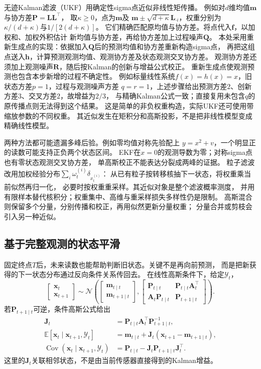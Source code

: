 无迹Kalman滤波（UKF）用确定性sigma点近似非线性矩传播。
例如对$d$维均值$\bm m$与协方差$\bm P=\bm L\bm L^\top$，
取$\kappa\geq0$，点为$\bm m$及
$\bm m\pm\sqrt{d+\kappa}\bm L_{\cdot i}$，权重分别为
$\kappa/(d+\kappa)$与$1/[2(d+\kappa)]$。
它们精确匹配原均值与协方差。将点代入$\bm f$，以加权和、加权外积估计
新均值与协方差，再给协方差加上过程噪声$\bm Q$。
本处采用重新生成点的实现：依据加入$\bm Q$后的预测均值和协方差重新构造sigma点，
再把这组点送入$\bm h$，计算预测观测均值、观测协方差及状态观测交叉协方差。
观测协方差还须加上观测噪声$\bm R$，随后按Kalman的创新与增益公式校正。
重新生成点使观测预测也包含本步新增的过程不确定性。
例如标量线性系统$f(x)=h(x)=x$，旧状态方差$p=1$，过程与观测噪声方差
$q=r=1$，上述步骤给出预测方差$2$、创新方差$3$、交叉方差$2$，故增益为$2/3$，
与精确Kalman公式一致；直接复用未包含$q$的原传播点则无法得到这个结果。
这是简单的非负权重构造，实际UKF还可使用带缩放参数的不同权重。
其近似发生在矩积分和高斯投影，不是把非线性模型变成精确线性模型。

两种方法都可能遗漏多峰后验。例如零均值对称先验配上
$y=x^2+v$，一个明显正的读数可能支持正负两个状态区间。
EKF在$x=0$的观测导数为零；对称sigma点也有零状态观测交叉协方差，
单高斯校正不能表达分裂成两峰的证据。
粒子滤波改用加权经验分布$\sum_i\omega_t^{(i)}\delta_{x_t^{(i)}}$：
从已有粒子按转移核抽下一状态，将权重乘当前似然再归一化，
必要时按权重重采样。其近似对象是整个滤波概率测度，
并用有限样本替代核积分；权重集中、高维与重采样损失多样性仍是限制。
高斯混合则保留多个分量，分别传播和校正，再用似然更新分量权重；
分量合并或剪枝会引入另一种近似。

\subsection{基于完整观测的状态平滑}
固定终点$T$后，未来读数也能帮助判断旧状态。关键不是再向前预测，
而是把新获得的下一状态分布通过反向条件关系传回去。
在线性高斯条件下，给定$\mathcal Y_t$，
\[
 \begin{bmatrix}\bm x_t\\\bm x_{t+1}\end{bmatrix}
 \sim\mathcal N\left(
 \begin{bmatrix}\bm m_{t\mid t}\\\bm m_{t+1\mid t}\end{bmatrix},
 \begin{bmatrix}
  \bm P_{t\mid t}&\bm P_{t\mid t}\bm A_t^\top\\
  \bm A_t\bm P_{t\mid t}&\bm P_{t+1\mid t}
 \end{bmatrix}\right).
\]
若$\bm P_{t+1\mid t}$可逆，条件高斯公式给出
\begin{align}
 \bm J_t&=\bm P_{t\mid t}\bm A_t^\top\bm P_{t+1\mid t}^{-1},
    \label{eq:dynamical-rts-gain}\\
 \mathbb E[\bm x_t\mid\bm x_{t+1},\mathcal Y_t]
   &=\bm m_{t\mid t}+\bm J_t(\bm x_{t+1}-\bm m_{t+1\mid t}),
    \label{eq:dynamical-rts-one-step-conditional-mean}\\
 \operatorname{Cov}(\bm x_t\mid\bm x_{t+1},\mathcal Y_t)
   &=\bm P_{t\mid t}-\bm J_t\bm P_{t+1\mid t}\bm J_t^\top.
    \label{eq:dynamical-rts-one-step-conditional-covariance}
\end{align}
这里的$\bm J_t$关联相邻状态，不是由当前传感器直接得到的Kalman增益。

